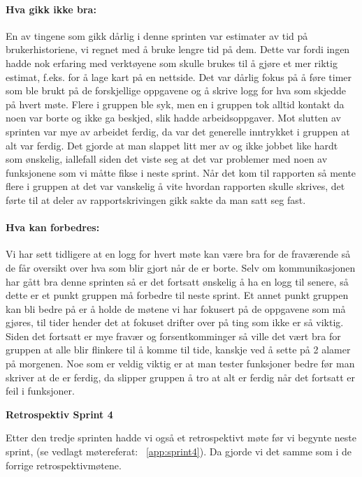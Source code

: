 \documentclass[12pt,a4paper,norsk]{article}
\begin{document}
\paragraph{Hva gikk ikke bra:}
En av tingene som gikk dårlig i denne sprinten var estimater av tid på brukerhistoriene, vi regnet med å bruke lengre tid på dem. Dette var fordi ingen hadde nok erfaring med verktøyene som skulle brukes til å gjøre et mer riktig estimat, f.eks. for å lage kart på en nettside.
Det var dårlig fokus på å føre timer som ble brukt på de forskjellige oppgavene og å skrive logg for hva som skjedde på hvert møte.
Flere i gruppen ble syk, men en i gruppen tok alltid kontakt da noen var borte og ikke ga beskjed, slik hadde arbeidsoppgaver.
Mot slutten av sprinten var mye av arbeidet ferdig, da var det generelle inntrykket i gruppen at alt var ferdig. Det gjorde at man slappet litt mer av og ikke jobbet like hardt som ønskelig, iallefall siden det viste seg at det var problemer med noen av funksjonene som vi måtte fikse i neste sprint.
Når det kom til rapporten så mente flere i gruppen at det var vanskelig å vite hvordan rapporten skulle skrives, det førte til at deler av rapportskrivingen gikk sakte da man satt seg fast.

\paragraph{Hva kan forbedres:}
Vi har sett tidligere at en logg for hvert møte kan være bra for de fraværende så de får oversikt over hva som blir gjort når de er borte. Selv om kommunikasjonen har gått bra denne sprinten så er det fortsatt ønskelig å ha en logg til senere, så dette er et punkt gruppen må forbedre til neste sprint.
Et annet punkt gruppen kan bli bedre på er å holde de møtene vi har fokusert på de oppgavene som må gjøres, til tider hender det at fokuset drifter over på ting som ikke er så viktig. Siden det fortsatt er mye fravær og forsentkomminger så ville det vært bra for gruppen at alle blir flinkere til å komme til tide, kanskje ved å sette på 2 alamer på morgenen.
Noe som er veldig viktig er at man tester funksjoner bedre før man skriver at de er ferdig, da slipper gruppen å tro at alt er ferdig når det fortsatt er feil i funksjoner.


\bigskip \noindent \textbf{Retrospektiv Sprint 4}
\par Etter den tredje sprinten hadde vi også et retrospektivt møte før vi begynte neste sprint, (se vedlagt møtereferat: ~\cref{app:sprint4}). Da gjorde vi det samme som i de forrige retrospektivmøtene.
\end{document}
